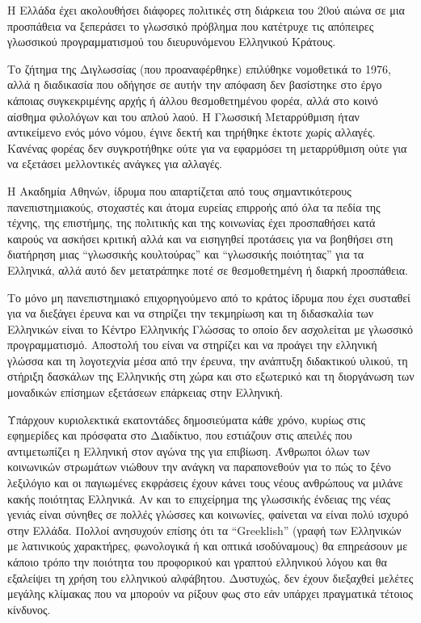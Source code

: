 \documentclass[]{../../metanetpaper}
\begin{document}
\begin{multicols}{2}
Η Ελλάδα έχει ακολουθήσει διάφορες πολιτικές  στη διάρκεια του 20ού αιώνα σε μια προσπάθεια να ξεπεράσει το γλωσσικό πρόβλημα που κατέτρυχε τις απόπειρες γλωσσικού προγραμματισμού του διευρυνόμενου Ελληνικού Κράτους. 

Το ζήτημα της Διγλωσσίας (που προαναφέρθηκε) επιλύθηκε νομοθετικά το 1976, αλλά η διαδικασία που οδήγησε σε αυτήν την απόφαση δεν βασίστηκε στο έργο κάποιας συγκεκριμένης αρχής ή άλλου θεσμοθετημένου φορέα, αλλά στο κοινό αίσθημα φιλολόγων και του απλού λαού. Η Γλωσσική Μεταρρύθμιση ήταν αντικείμενο ενός μόνο νόμου,  έγινε δεκτή και τηρήθηκε έκτοτε χωρίς αλλαγές. Κανένας φορέας δεν συγκροτήθηκε ούτε για να εφαρμόσει τη μεταρρύθμιση ούτε για να εξετάσει μελλοντικές ανάγκες για αλλαγές.

Η Ακαδημία Αθηνών, ίδρυμα που απαρτίζεται από τους σημαντικότερους πανεπιστημιακούς, στοχαστές και άτομα ευρείας επιρροής από όλα τα πεδία της τέχνης, της επιστήμης, της πολιτικής και της κοινωνίας έχει προσπαθήσει κατά καιρούς  να ασκήσει κριτική αλλά και να εισηγηθεί προτάσεις για να βοηθήσει στη διατήρηση μιας “γλωσσικής κουλτούρας” και “γλωσσικής ποιότητας” για τα Ελληνικά, αλλά αυτό δεν μετατράπηκε ποτέ σε θεσμοθετημένη ή διαρκή προσπάθεια.

Το μόνο μη πανεπιστημιακό επιχορηγούμενο από το κράτος ίδρυμα που έχει συσταθεί για να διεξάγει έρευνα και να στηρίζει την τεκμηρίωση και τη διδασκαλία των Ελληνικών είναι το Κέντρο Ελληνικής Γλώσσας το οποίο δεν ασχολείται με   γλωσσικό προγραμματισμό. Αποστολή του είναι να στηρίζει και να προάγει την ελληνική γλώσσα και τη λογοτεχνία μέσα από την έρευνα, την ανάπτυξη διδακτικού υλικού, τη στήριξη δασκάλων της Ελληνικής στη χώρα και στο εξωτερικό και τη διοργάνωση των μοναδικών επίσημων εξετάσεων επάρκειας στην Ελληνική.

Υπάρχουν κυριολεκτικά εκατοντάδες δημοσιεύματα κάθε χρόνο, κυρίως στις εφημερίδες και πρόσφατα στο Διαδίκτυο, που εστιάζουν στις απειλές που αντιμετωπίζει η Ελληνική στον αγώνα της για επιβίωση. Άνθρωποι όλων των κοινωνικών στρωμάτων νιώθουν την ανάγκη να παραπονεθούν για το πώς το ξένο λεξιλόγιο και οι παγιωμένες εκφράσεις  έχουν κάνει τους νέους ανθρώπους να μιλάνε κακής ποιότητας Ελληνικά. Αν και το επιχείρημα της γλωσσικής ένδειας της νέας γενιάς είναι σύνηθες σε πολλές γλώσσες και κοινωνίες, φαίνεται να είναι πολύ ισχυρό στην Ελλάδα. Πολλοί ανησυχούν επίσης ότι τα “Greeklish” (γραφή των Ελληνικών με λατινικούς χαρακτήρες, φωνολογικά ή και οπτικά ισοδύναμους) θα επηρεάσουν με κάποιο τρόπο την ποιότητα του προφορικού και γραπτού ελληνικού λόγου και θα εξαλείψει τη χρήση του  ελληνικού αλφάβητου. Δυστυχώς, δεν έχουν διεξαχθεί μελέτες μεγάλης κλίμακας που να μπορούν να ρίξουν φως στο εάν υπάρχει πραγματικά τέτοιος κίνδυνος.


\end{multicols}
\end{document}
